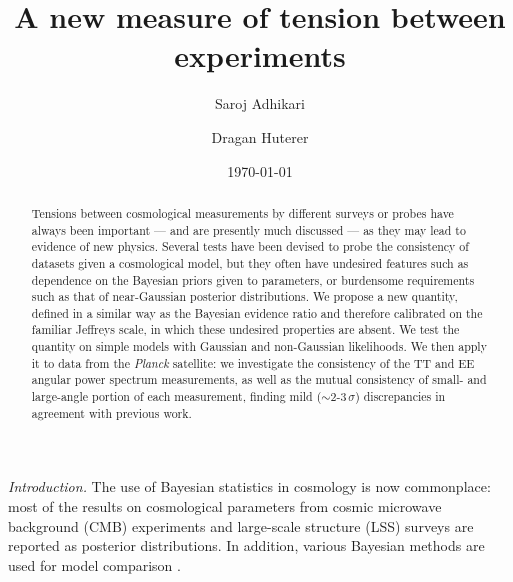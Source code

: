 \documentclass[amsmath, amssymb, reprint, aps]{revtex4-1}
\begin{document}
    \title{A new measure of tension between experiments}    
    \author{Saroj Adhikari} 
    \author{Dragan Huterer}     
    \date{\today}
    
    \begin{abstract}
        Tensions between cosmological measurements by different surveys or probes have always been important --- and are presently much discussed --- as they may lead to evidence of new physics.  Several tests have been devised to probe the consistency of datasets given a cosmological model, but they often have undesired features such as dependence on the Bayesian priors given to parameters, or burdensome requirements such as that of near-Gaussian posterior distributions. We propose a new quantity, defined in a similar way as the Bayesian evidence ratio and therefore calibrated on the familiar Jeffreys scale, in which these undesired properties are absent. We test the quantity on simple models with Gaussian and non-Gaussian likelihoods. We then apply it to data from the {\it Planck} satellite: we investigate the consistency of the TT and EE angular power spectrum measurements, as well as the mutual consistency of small- and large-angle portion of each measurement, finding mild ($\sim$2-$3\,\sigma$) discrepancies in agreement with previous work. 
    \end{abstract}
    
    \maketitle
    \medskip
    \textit{Introduction.}
    The use of Bayesian statistics in cosmology is now commonplace: most of the results on cosmological parameters from cosmic microwave background (CMB) experiments \cite{Ade:2015xua} and large-scale structure (LSS) surveys \cite{Abbott:2017wau} are reported as posterior distributions. In addition, various Bayesian methods are used for model comparison \cite{Trotta:2008qt}.
    
\end{document}
